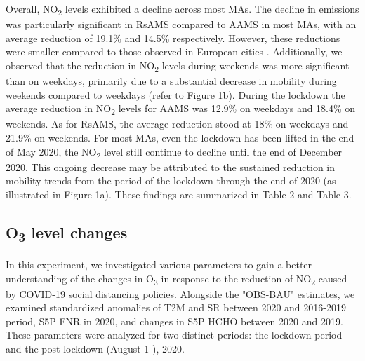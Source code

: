 Overall, NO\textsubscript{2} levels exhibited a decline across most MAs. The decline in emissions was particularly significant in RsAMS compared to AAMS in most MAs, with an average reduction of 19.1\% and 14.5\% respectively. However, these reductions were smaller compared to those observed in European cities \citep{barre2021estimating,grange2021covid}. Additionally, we observed that the reduction in NO\textsubscript{2} levels during weekends was more significant than on weekdays, primarily due to a substantial decrease in mobility during weekends compared to weekdays (refer to Figure 1b). During the lockdown the average reduction in NO\textsubscript{2} levels for AAMS was 12.9\% on weekdays and 18.4\% on weekends. As for RsAMS, the average reduction stood at 18\% on weekdays and 21.9\% on weekends. For most MAs, even the lockdown has been lifted in the end of May 2020, the NO\textsubscript{2} level still continue to decline until the end of December 2020. This ongoing decrease may be attributed to the sustained reduction in mobility trends from the period of the lockdown through the end of 2020 (as illustrated in Figure 1a). These findings are summarized in Table 2 and Table 3. \par

\subsection{O\textsubscript{3} level changes}
In this experiment, we investigated various parameters to gain a better understanding of the changes in O\textsubscript{3} in response to the reduction of NO\textsubscript{2} caused by COVID-19 social distancing policies. Alongside the "OBS-BAU" estimates, we examined standardized anomalies of T2M and SR between 2020 and 2016-2019 period, S5P FNR in 2020, and changes in S5P HCHO between 2020 and 2019. These parameters were analyzed for two distinct periods: the lockdown period and the post-lockdown (August 1 ), 2020. \par

